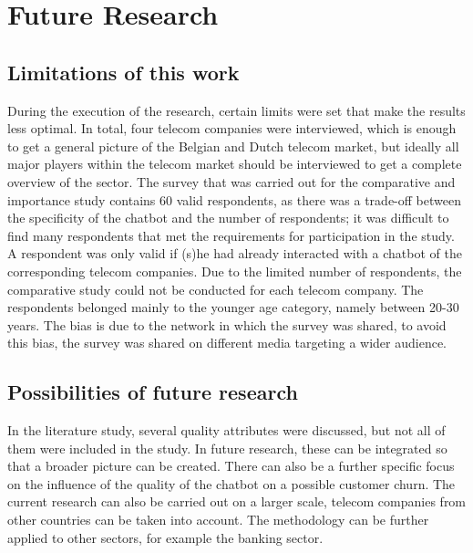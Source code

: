 \mainmatter
\pagestyle{headings}
\chapter{Future Research}
\label{ch:futureResearch}

\section{Limitations of this work}
During the execution of the research, certain limits were set that make the results less optimal. In total, four telecom companies were interviewed, which is enough to get a general picture of the Belgian and Dutch telecom market, but ideally all major players within the telecom market should be interviewed to get a complete overview of the sector. The survey that was carried out for the comparative and importance study contains 60 valid respondents, as there was a trade-off between the specificity of the chatbot and the number of respondents; it was difficult to find many respondents that met the requirements for participation in the study. A respondent was only valid if (s)he had already interacted with a chatbot of the corresponding telecom companies. Due to the limited number of respondents, the comparative study could not be conducted for each telecom company. The respondents belonged mainly to the younger age category, namely between 20-30 years. The bias is due to the network in which the survey was shared, to avoid this bias, the survey was shared on different media targeting a wider audience.

\section{Possibilities of future research}
In the literature study, several quality attributes were discussed, but not all of them were included in the study. In future research, these can be integrated so that a broader picture can be created. There can also be a further specific focus on the influence of the quality of the chatbot on a possible customer churn. The current research can also be carried out on a larger scale, telecom companies from other countries can be taken into account. The methodology can be further applied to other sectors, for example the banking sector.